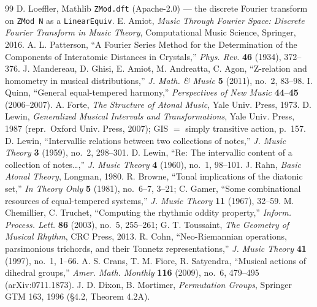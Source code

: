 \documentclass[11pt]{article}
\newcommand{\lean}[1]{\texttt{#1}}
\begin{document}
\begin{thebibliography}{99}
 D. Loeffler, Mathlib \lean{ZMod.dft} (Apache-2.0) --- the discrete Fourier
  transform on \lean{ZMod N} as a \lean{LinearEquiv}.
 E. Amiot, \emph{Music Through Fourier Space: Discrete Fourier Transform in Music
  Theory}, Computational Music Science, Springer, 2016.
 A. L. Patterson, ``A Fourier Series Method for the Determination of the
  Components of Interatomic Distances in Crystals,'' \emph{Phys. Rev.} \textbf{46} (1934),
  372--376.
 J. Mandereau, D. Ghisi, E. Amiot, M. Andreatta, C. Agon, ``Z-relation and
  homometry in musical distributions,'' \emph{J. Math. \& Music} \textbf{5} (2011), no.~2,
  83--98.
 I. Quinn, ``General equal-tempered harmony,'' \emph{Perspectives of New Music}
  \textbf{44}--\textbf{45} (2006--2007).
 A. Forte, \emph{The Structure of Atonal Music}, Yale Univ. Press, 1973.
 D. Lewin, \emph{Generalized Musical Intervals and Transformations}, Yale Univ.
  Press, 1987 (repr.\ Oxford Univ. Press, 2007); GIS $=$ simply transitive action, p.~157.
 D. Lewin, ``Intervallic relations between two collections of notes,''
  \emph{J. Music Theory} \textbf{3} (1959), no.~2, 298--301.
 D. Lewin, ``Re: The intervallic content of a collection of notes\dots,''
  \emph{J. Music Theory} \textbf{4} (1960), no.~1, 98--101.
 J. Rahn, \emph{Basic Atonal Theory}, Longman, 1980.
 R. Browne, ``Tonal implications of the diatonic set,'' \emph{In Theory Only}
  \textbf{5} (1981), no.~6--7, 3--21; C. Gamer, ``Some combinational resources of equal-tempered
  systems,'' \emph{J. Music Theory} \textbf{11} (1967), 32--59.
 M. Chemillier, C. Truchet, ``Computing the rhythmic oddity property,''
  \emph{Inform. Process. Lett.} \textbf{86} (2003), no.~5, 255--261; G. T. Toussaint, \emph{The
  Geometry of Musical Rhythm}, CRC Press, 2013.
 R. Cohn, ``Neo-Riemannian operations, parsimonious trichords, and their Tonnetz
  representations,'' \emph{J. Music Theory} \textbf{41} (1997), no.~1, 1--66.
 A. S. Crans, T. M. Fiore, R. Satyendra, ``Musical actions of dihedral groups,''
  \emph{Amer. Math. Monthly} \textbf{116} (2009), no.~6, 479--495 (arXiv:0711.1873).
 J. D. Dixon, B. Mortimer, \emph{Permutation Groups}, Springer GTM 163, 1996
  (\S4.2, Theorem 4.2A).

\end{thebibliography}
\end{document}
